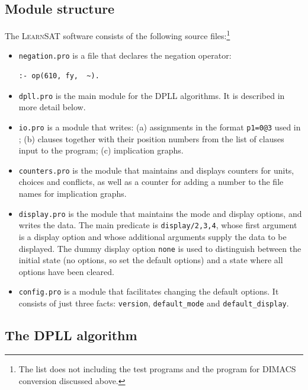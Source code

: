 \documentclass[11pt]{article}
\newcommand*{\p}[1]{\textup{\texttt{#1}}}
\newcommand*{\ls}{\textsc{LearnSAT}}
\begin{document}
\subsection{Module structure}

The \ls{} software consists of the following source files:\footnote{The
list does not including the test programs and the program for DIMACS
conversion discussed above.}

\begin{itemize}
\item \p{negation.pro} is a file that declares the negation operator:
\begin{verbatim}
:- op(610, fy,  ~).
\end{verbatim}

\item \p{dpll.pro} is the main module for the DPLL algorithms. It is
described in more detail below.

\item \p{io.pro} is a module that writes: (a) assignments in the format
\p{p1=0@3} used in \cite{mlm}; (b) clauses together with their position
numbers from the list of clauses input to the program; (c) implication
graphs.

\item \p{counters.pro} is the module that maintains and displays counters
for units, choices and conflicts, as well as a counter for adding a
number to the file names for implication graphs.

\item \p{display.pro} is the module that maintains the mode and display
options, and writes the data. The main predicate is \p{display/2,3,4},
whose first argument is a display option and whose additional
arguments supply the data to be displayed. The dummy display option
\p{none} is used to distinguish between the initial state (no options,
so set the default options) and a state where all options have been
cleared.

\item \p{config.pro} is a module that facilitates changing the default
options. It consists of just three facts: \p{version}, \p{default\_mode}
and \p{default\_display}.

\end{itemize}

\subsection{The DPLL algorithm}
\end{document}
